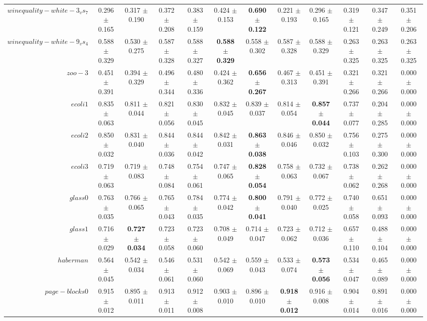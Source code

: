 \begin{table}[!ht]
{\begin{tabular}{r c c c c c c c c c c c}
$winequality-white-3_vs_7$ & 0.296 $\pm$ 0.165 & 0.317 $\pm$ 0.190 & 0.372 $\pm$ 0.208 & 0.383 $\pm$ 0.159 & 0.424 $\pm$ 0.153 & \textbf{0.690 $\pm$ 0.122} & 0.221 $\pm$ 0.193 & 0.296 $\pm$ 0.165 & 0.319 $\pm$ 0.121 & 0.347 $\pm$ 0.249 & 0.351 $\pm$ 0.206 \\
$winequality-white-9_vs_4$ & 0.588 $\pm$ 0.329 & 0.530 $\pm$ 0.275 & 0.587 $\pm$ 0.328 & 0.588 $\pm$ 0.327 & \textbf{0.588 $\pm$ 0.329} & 0.558 $\pm$ 0.302 & 0.587 $\pm$ 0.328 & 0.588 $\pm$ 0.329 & 0.263 $\pm$ 0.325 & 0.263 $\pm$ 0.325 & 0.263 $\pm$ 0.325 \\
$zoo-3$ & 0.451 $\pm$ 0.391 & 0.394 $\pm$ 0.329 & 0.496 $\pm$ 0.344 & 0.480 $\pm$ 0.336 & 0.424 $\pm$ 0.362 & \textbf{0.656 $\pm$ 0.267} & 0.467 $\pm$ 0.313 & 0.451 $\pm$ 0.391 & 0.321 $\pm$ 0.266 & 0.321 $\pm$ 0.266 & 0.000 $\pm$ 0.000 \\
$ecoli1$ & 0.835 $\pm$ 0.063 & 0.811 $\pm$ 0.044 & 0.821 $\pm$ 0.056 & 0.830 $\pm$ 0.045 & 0.832 $\pm$ 0.045 & 0.839 $\pm$ 0.037 & 0.814 $\pm$ 0.054 & \textbf{0.857 $\pm$ 0.044} & 0.737 $\pm$ 0.077 & 0.204 $\pm$ 0.285 & 0.000 $\pm$ 0.000 \\
$ecoli2$ & 0.850 $\pm$ 0.032 & 0.831 $\pm$ 0.040 & 0.844 $\pm$ 0.036 & 0.844 $\pm$ 0.042 & 0.842 $\pm$ 0.031 & \textbf{0.863 $\pm$ 0.038} & 0.846 $\pm$ 0.046 & 0.850 $\pm$ 0.032 & 0.756 $\pm$ 0.103 & 0.275 $\pm$ 0.300 & 0.000 $\pm$ 0.000 \\
$ecoli3$ & 0.719 $\pm$ 0.063 & 0.719 $\pm$ 0.083 & 0.748 $\pm$ 0.084 & 0.754 $\pm$ 0.061 & 0.747 $\pm$ 0.065 & \textbf{0.828 $\pm$ 0.054} & 0.758 $\pm$ 0.063 & 0.732 $\pm$ 0.067 & 0.738 $\pm$ 0.062 & 0.262 $\pm$ 0.268 & 0.000 $\pm$ 0.000 \\
$glass0$ & 0.763 $\pm$ 0.035 & 0.766 $\pm$ 0.065 & 0.765 $\pm$ 0.043 & 0.784 $\pm$ 0.035 & 0.774 $\pm$ 0.042 & \textbf{0.800 $\pm$ 0.041} & 0.791 $\pm$ 0.040 & 0.772 $\pm$ 0.025 & 0.740 $\pm$ 0.058 & 0.651 $\pm$ 0.093 & 0.000 $\pm$ 0.000 \\
$glass1$ & 0.716 $\pm$ 0.029 & \textbf{0.727 $\pm$ 0.034} & 0.723 $\pm$ 0.058 & 0.723 $\pm$ 0.060 & 0.708 $\pm$ 0.049 & 0.714 $\pm$ 0.047 & 0.723 $\pm$ 0.062 & 0.712 $\pm$ 0.036 & 0.657 $\pm$ 0.110 & 0.488 $\pm$ 0.104 & 0.000 $\pm$ 0.000 \\
$haberman$ & 0.564 $\pm$ 0.045 & 0.542 $\pm$ 0.034 & 0.546 $\pm$ 0.061 & 0.531 $\pm$ 0.060 & 0.542 $\pm$ 0.069 & 0.559 $\pm$ 0.043 & 0.533 $\pm$ 0.074 & \textbf{0.573 $\pm$ 0.056} & 0.534 $\pm$ 0.047 & 0.465 $\pm$ 0.089 & 0.000 $\pm$ 0.000 \\
$page-blocks0$ & 0.915 $\pm$ 0.012 & 0.895 $\pm$ 0.011 & 0.913 $\pm$ 0.011 & 0.912 $\pm$ 0.008 & 0.903 $\pm$ 0.010 & 0.896 $\pm$ 0.010 & \textbf{0.918 $\pm$ 0.012} & 0.916 $\pm$ 0.008 & 0.904 $\pm$ 0.014 & 0.891 $\pm$ 0.016 & 0.000 $\pm$ 0.000 \\

\end{tabular}}
\end{table}
